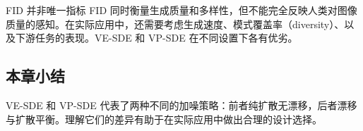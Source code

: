 \begin{warningbox}{FID 并非唯一指标}
FID 同时衡量生成质量和多样性，但不能完全反映人类对图像质量的感知。在实际应用中，还需要考虑生成速度、模式覆盖率（diversity）、以及下游任务的表现。VE-SDE 和 VP-SDE 在不同设置下各有优劣。
\end{warningbox}

\subsection{本章小结}

VE-SDE 和 VP-SDE 代表了两种不同的加噪策略：前者纯扩散无漂移，后者漂移与扩散平衡。理解它们的差异有助于在实际应用中做出合理的设计选择。


